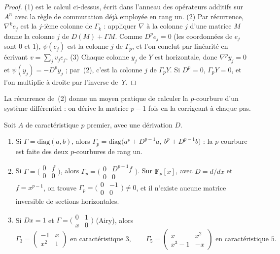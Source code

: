\begin{proof}
(1) est le calcul ci-dessus, écrit dans l'anneau des opérateurs additifs sur $A^n$ avec la règle de commutation déjà employée en rang un. (2) Par récurrence, $\nabla^k e_j$ est la $j$-ième colonne de $\Gamma_k$ : appliquer $\nabla$ à la colonne $j$ d'une matrice $M$ donne la colonne $j$ de $D(M) + \Gamma M$. Comme $D^p e_j = 0$ (les coordonnées de $e_j$ sont $0$ et $1$), $\psi(e_j)$ est la colonne $j$ de $\Gamma_p$, et l'on conclut par linéarité en écrivant $v = \sum_j v_j e_j$. (3) Chaque colonne $y_j$ de $Y$ est horizontale, donc $\nabla^p y_j = 0$ et $\psi(y_j) = -D^p y_j$ ; par~(2), c'est la colonne $j$ de $\Gamma_p Y$. Si $D^p = 0$, $\Gamma_p Y = 0$, et l'on multiplie à droite par l'inverse de~$Y$.
\end{proof}

La récurrence de~(2) donne un moyen pratique de calculer la $p$-courbure d'un système différentiel : on dérive la matrice $p - 1$ fois en la corrigeant à chaque pas.

\begin{enonce}
Soit $A$ de caractéristique $p$ premier, avec une dérivation $D$.
\begin{enumerate}
\item Si $\Gamma = \mathrm{diag}(a, b)$, alors $\Gamma_p = \mathrm{diag}\bigl(a^p + D^{p-1}a,\ b^p + D^{p-1}b\bigr)$ : la $p$-courbure est faite des deux $p$-courbures de rang un.
\item Si $\Gamma = \bigl(\begin{smallmatrix} 0 & f \\ 0 & 0 \end{smallmatrix}\bigr)$, alors $\Gamma_p = \bigl(\begin{smallmatrix} 0 & D^{p-1} f \\ 0 & 0 \end{smallmatrix}\bigr)$. Sur $\mathbf F_p[x]$, avec $D = d/dx$ et $f = x^{p-1}$, on trouve $\Gamma_p = \bigl(\begin{smallmatrix} 0 & -1 \\ 0 & 0 \end{smallmatrix}\bigr) \neq 0$, et il n'existe aucune matrice inversible de sections horizontales.
\item Si $Dx = 1$ et $\Gamma = \bigl(\begin{smallmatrix} 0 & 1 \\ x & 0 \end{smallmatrix}\bigr)$ (Airy), alors
\[
\Gamma_3 = \begin{pmatrix} -1 & x \\ x^2 & 1 \end{pmatrix} \text{ en caractéristique } 3, \qquad
\Gamma_5 = \begin{pmatrix} x & x^2 \\ x^3 - 1 & -x \end{pmatrix} \text{ en caractéristique } 5 .
\]
\end{enumerate}
\end{enonce}

